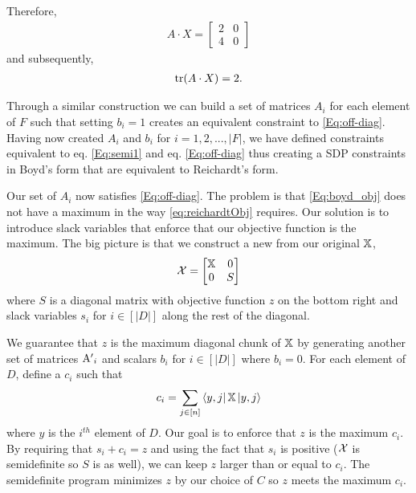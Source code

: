 Therefore,
\begin{align}
    A \cdot X = \left[ \begin{matrix} 2 & 0 \\ 4 & 0 \end{matrix} \right] \nonumber
\end{align}
and subsequently,
\begin{align}
    \operatorname{\text{tr}}(A \cdot X) = 2. \nonumber
\end{align}

Through a similar construction we can build a set of matrices 
$A_i$ for each element of $F$ such that setting $b_i = 1$ 
creates an equivalent constraint to \cref{Eq:off-diag}.
Having now created $A_i$ and $b_i$ for $i = 1,2,...,
|F|$, we have defined constraints equivalent to eq.
\ref{Eq:semi1} and eq. \ref{Eq:off-diag} thus creating
a SDP constraints in Boyd's form that are equivalent to
Reichardt's form.

Our set of $A_i$ now satisfies \cref{Eq:off-diag}.
The problem is that \cref{Eq:boyd_obj}
does not have a maximum in the way \cref{eq:reichardtObj}
requires.
Our solution is to introduce slack variables
that enforce that our objective function is the maximum.
The big picture is that we construct a new
from our original $\operatorname{\mathbb{X}}$,
\begin{align}
    \operatorname{\mathcal{X}} =
    \left[
    \begin{matrix}
    \operatorname{\mathbb{X}} & 0 \\
    0 & S
    \end{matrix}
    \right] \nonumber
\end{align}
where $S$ is a diagonal matrix
with objective function $z$ on the bottom right
and slack variables $s_i$ for $i \in [|D|]$
along the rest of the diagonal.

We guarantee that $z$ is the maximum
diagonal chunk of $\operatorname{\mathbb{X}}$
by generating another set of matrices 
$\operatorname{A^\prime}_i$ and scalars $b_i$ for $i \in [|D|]$
where $b_i = 0$.
For each element of $D$, define a $c_i$ such that
\begin{align}
    c_i = \sum_{j \in [n]} \bra{y,j}\operatorname{\mathbb{X}}\ket{y,j}
    \nonumber
\end{align} 
where $y$ is the $i^{th}$ element of $D$.
Our goal is to enforce that $z$ is the maximum $c_i$.
By requiring that $s_i + c_i = z$ and using
the fact that $s_i$ is positive
($\operatorname{\mathcal{X}}$ is semidefinite so $S$ is as well),
we can keep $z$ larger than or equal to $c_i$.
The semidefinite program minimizes $z$
by our choice of $C$ so $z$ meets the maximum $c_i$.

